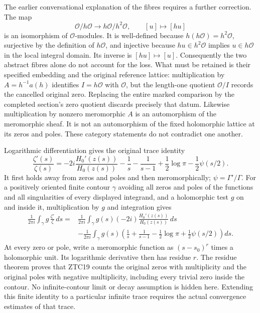 The earlier conversational explanation of the fibres requires a
further correction. The map
\begin{equation}\tag{ZTC17a}
 \mathcal O/h\mathcal O\longrightarrow
 h\mathcal O/h^2\mathcal O,\qquad [u]\longmapsto[hu]
\end{equation}
is an isomorphism of $\mathcal O$-modules. It is well-defined because
$h(h\mathcal O)=h^2\mathcal O$, surjective by the definition of
$h\mathcal O$, and injective because $hu\in h^2\mathcal O$ implies
$u\in h\mathcal O$ in the local integral domain. Its inverse is
$[hu]\mapsto[u]$. Consequently the two abstract fibres alone do
not account for the loss. What must be retained is their specified
embedding and the original reference lattice: multiplication by
$A=h^{-1}a(h)$ identifies $I=h\mathcal O$ with $\mathcal O$, but
the length-one quotient $\mathcal O/I$ records the cancelled
original zero. Replacing the entire marked comparison by the
completed section's zero quotient discards precisely that datum.
Likewise multiplication by nonzero meromorphic $A$ is an
automorphism of the meromorphic sheaf. It is not an automorphism
of the fixed holomorphic lattice at its zeros and poles. These
category statements do not contradict one another.

Logarithmic differentiation gives the original trace identity
\begin{equation}\tag{ZTC18}
 \frac{\zeta'(s)}{\zeta(s)}
 =-2i\frac{H_0'(z(s))}{H_0(z(s))}
 -\frac1s-\frac1{s-1}+\frac12\log\pi-\frac12\psi(s/2).
\end{equation}
It first holds away from zeros and poles and then meromorphically;
$\psi=\Gamma'/\Gamma$. For a positively oriented finite contour
$\gamma$ avoiding all zeros and poles of the functions and all
singularities of every displayed integrand, and a holomorphic test $g$
on and inside it, multiplication by $g$ and integration gives
\begin{equation}\tag{ZTC19}
\begin{split}
 \frac1{2\pi i}\int_\gamma g\,\frac{\zeta'}\zeta\,ds
 ={}&\frac1{2\pi i}\int_\gamma
           g(s)(-2i)\frac{H_0'(z(s))}{H_0(z(s))}\,ds\\
 &-\frac1{2\pi i}\int_\gamma g(s)
   \left(\frac1s+\frac1{s-1}-\frac12\log\pi
                         +\frac12\psi(s/2)\right)ds.
\end{split}
\end{equation}
At every zero or pole, write a meromorphic function as
$(s-s_0)^r$ times a holomorphic unit. Its logarithmic derivative
then has residue $r$. The residue theorem proves that ZTC19
counts the original zeros with multiplicity and the original poles
with negative multiplicity, including every trivial zero inside
the contour. No infinite-contour limit or decay assumption is
hidden here. Extending this finite identity to a particular infinite
trace requires the actual convergence estimates of that trace.

